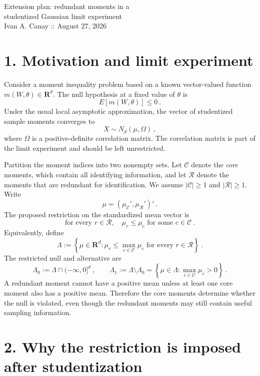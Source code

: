 \documentclass[12pt]{article}
\theoremstyle{remark}
\begin{document}
\begin{center}
{\Large Extension plan: redundant moments in a\\ studentized Gaussian limit experiment}\\[3pt]
{\small Ivan A. Canay :: August 27, 2026}
\end{center}

\medskip

\section*{1. Motivation and limit experiment}

Consider a moment inequality problem based on a known vector-valued function $m(W,\theta)\in\mathbf R^d$.  The null hypothesis at a fixed value of $\theta$ is
\[
E[m(W,\theta)]\le0~.
\]
Under the usual local asymptotic approximation, the vector of studentized sample moments converges to
\[
X\sim N_d(\mu,\Omega)~,
\]
where $\Omega$ is a positive-definite correlation matrix.  The correlation matrix is part of the limit experiment and should be left unrestricted.

Partition the moment indices into two nonempty sets.  Let $\mathcal C$ denote the \emph{core} moments, which contain all identifying information, and let $\mathcal R$ denote the moments that are redundant for identification. We assume $|\mathcal C| \geq 1$ and $|\mathcal R| \geq 1$. Write
\[
\mu=(\mu_{\mathcal C}',\mu_{\mathcal R}')'~.
\]
The proposed restriction on the standardized mean vector is
\begin{equation}\label{eq:redundancy}
\text{for every }r\in\mathcal R,\quad
\mu_r\le\mu_c\text{ for some }c\in\mathcal C~.
\end{equation}
Equivalently, define
\[
\Lambda
:=
\left\{\mu\in\mathbf R^d:
\mu_r\le\max_{c\in\mathcal C}\mu_c
\text{ for every }r\in\mathcal R
\right\}~.
\]
The restricted null and alternative are
\[
\Lambda_0:=\Lambda\cap(-\infty,0]^d~,
\qquad
\Lambda_1:=\Lambda\setminus\Lambda_0
=
\left\{\mu\in\Lambda:
\max_{c\in\mathcal C}\mu_c>0
\right\}~.
\]
A redundant moment cannot have a positive mean unless at least one core moment also has a positive mean.  Therefore the core moments determine whether the null is violated, even though the redundant moments may still contain useful sampling information.

\section*{2. Why the restriction is imposed after studentization}
\end{document}
